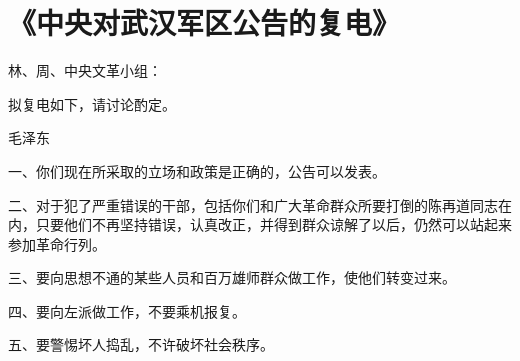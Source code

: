 \section[《中央对武汉军区公告的复电》（一九六七年七月二十五日）]{《中央对武汉军区公告的复电》}


林、周、中央文革小组：

拟复电如下，请讨论酌定。

{\raggedleft 毛泽东\par}

一、你们现在所采取的立场和政策是正确的，公告可以发表。

二、对于犯了严重错误的干部，包括你们和广大革命群众所要打倒的陈再道同志在内，只要他们不再坚持错误，认真改正，并得到群众谅解了以后，仍然可以站起来参加革命行列。

三、要向思想不通的某些人员和百万雄师群众做工作，使他们转变过来。

四、要向左派做工作，不要乘机报复。

五、要警惕坏人捣乱，不许破坏社会秩序。



